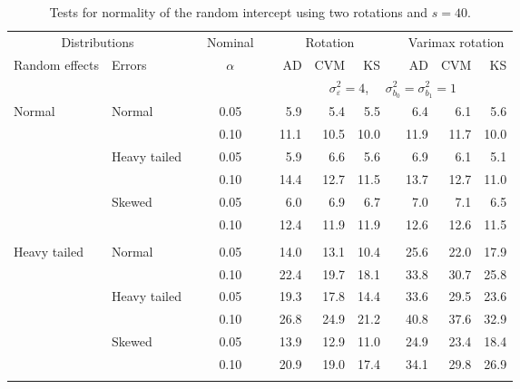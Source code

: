 \begin{table}[ht]
\caption{\label{tab:simb0s40-alt}Tests for normality of the random intercept using two rotations and $s = 40$.}
\begin{scriptsize}
\begin{center}
\begin{tabular}{ll p{.1cm} c p{.1cm} rrr p{.1cm} rrr}
  \hline
  \multicolumn{2}{c}{Distributions}& & Nominal & &  \multicolumn{3}{c}{Rotation} & & \multicolumn{3}{c}{Varimax rotation} \\ \cline{1-2} \cline{6-8} \cline{10-12}   
  Random effects & Errors & & $\alpha$ & & AD & CVM & KS & & AD & CVM & KS \\ 
   \hline
& && && \multicolumn{7}{c}{$\sigma_{\varepsilon}^2 = 4$, \ \ $\sigma_{b_0}^2 = \sigma_{b_1}^2 = 1$} \\ \cline{6-12}
\rowcolor{gray!20}Normal       & Normal       && 0.05 &&   5.9 & 5.4 & 5.5 &   & 6.4 & 6.1 & 5.6 \\ 
\rowcolor{gray!20}             &              && 0.10 &&   11.1 & 10.5 & 10.0 &   & 11.9 & 11.7 & 10.0 \\ 
\rowcolor{gray!20}             & Heavy tailed && 0.05 &&   5.9 & 6.6 & 5.6 &   & 6.9 & 6.1 & 5.1 \\ 
\rowcolor{gray!20}             &              && 0.10 &&   14.4 & 12.7 & 11.5 &   & 13.7 & 12.7 & 11.0 \\ 
\rowcolor{gray!20}             & Skewed       && 0.05 &&   6.0 & 6.9 & 6.7 &   & 7.0 & 7.1 & 6.5 \\ 
\rowcolor{gray!20}             &              && 0.10 &&   12.4 & 11.9 & 11.9 &   & 12.6 & 12.6 & 11.5 \\ 
&&&&&&&&&&&\\
Heavy tailed & Normal       && 0.05 &&   14.0 & 13.1 & 10.4 &   & 25.6 & 22.0 & 17.9 \\ 
             &              && 0.10 &&   22.4 & 19.7 & 18.1 &   & 33.8 & 30.7 & 25.8 \\ 
             & Heavy tailed && 0.05 &&   19.3 & 17.8 & 14.4 &   & 33.6 & 29.5 & 23.6 \\ 
             &              && 0.10 &&   26.8 & 24.9 & 21.2 &   & 40.8 & 37.6 & 32.9 \\ 
             & Skewed       && 0.05 &&   13.9 & 12.9 & 11.0 &   & 24.9 & 23.4 & 18.4 \\ 
             &              && 0.10 &&   20.9 & 19.0 & 17.4 &   & 34.1 & 29.8 & 26.9 \\ 
&&&&&&&&&&&\\

\end{tabular}
\end{center}
\end{scriptsize}
\end{table}
